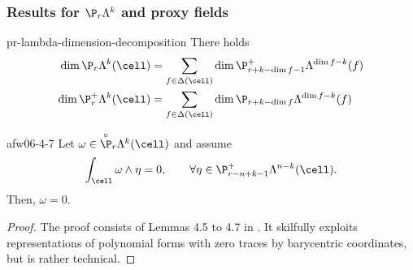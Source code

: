 \subsubsection{Results for $\P_r\Lambda^k$ and proxy fields}

\begin{Lemma}{pr-lambda-dimension-decomposition}
  There holds
  \begin{align}
    \dim \P_r\Lambda^k(\cell)
    &= \sum_{f\in\Delta(\cell)}
      \dim \P_{r+k-\dim f-1}^+\Lambda^{\dim f-k}(f) \\
    \dim \P_r^+\Lambda^k(\cell)
    &= \sum_{f\in\Delta(\cell)}
      \dim \P_{r+k-\dim f}\Lambda^{\dim f-k}(f)
  \end{align}
\end{Lemma}


\begin{Lemma}{afw06-4-7}
  Let $\omega \in \overset{\circ}{\P}_r \Lambda^k(\cell)$ and assume
  \begin{gather}
    \int_\cell\omega\wedge\eta = 0,
    \qquad\forall \eta\in\P_{r-n+k-1}^+\Lambda^{n-k}(\cell).
  \end{gather}
  Then, $\omega = 0$.
\end{Lemma}

\begin{proof}
  The proof consists of Lemmas 4.5 to 4.7 in
  \cite{ArnoldFalkWinther06acta}. It skilfully exploits representations of
  polynomial forms with zero traces by barycentric coordinates, but is
  rather technical.
\end{proof}

